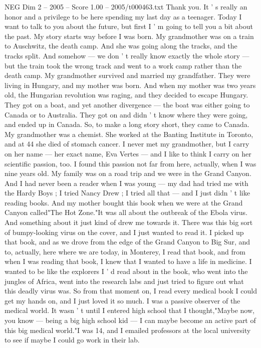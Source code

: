 \begin{textsample}{NEG Dim 2 – 2005 – Score 1.00 – 2005/t000463.txt}  \label{ex:f2_neg_074}
Thank you.
It ' s really an honor and a privilege to be here spending my last day as a teenager.
Today I want to talk to you about the future, but first I ' m going to tell you a bit about the past.
My story starts way before I was born.
My grandmother was on a train to Auschwitz, the death camp.
And she was going along the tracks, and the tracks split.
And somehow — we don ' t really know exactly the whole story — but the train took the wrong track and went to a work camp rather than the death camp.
My grandmother survived and married my grandfather.
They were living in Hungary, and my mother was born.
And when my mother was two years old, the Hungarian revolution was raging, and they decided to escape Hungary.
They got on a boat, and yet another divergence — the boat was either going to Canada or to Australia.
They got on and didn ' t know where they were going, and ended up in Canada.
So, to make a long story short, they came to Canada.
My grandmother was a chemist.
She worked at the Banting Institute in Toronto, and at 44 she died of stomach cancer.
I never met my grandmother, but I carry on her name — her exact name, Eva Vertes — and I like to think I carry on her scientific passion, too.
I found this passion not far from here, actually, when I was nine years old.
My family was on a road trip and we were in the Grand Canyon.
And I had never been a reader when I was young — my dad had tried me with the Hardy Boys ; I tried Nancy Drew ; I tried all that — and I just didn ' t like reading books.
And my mother bought this book when we were at the Grand Canyon called"The Hot Zone."It was all about the outbreak of the Ebola virus.
And something about it just kind of drew me towards it.
There was this big sort of bumpy-looking virus on the cover, and I just wanted to read it.
I picked up that book, and as we drove from the edge of the Grand Canyon to Big Sur, and to, actually, here where we are today, in Monterey, I read that book, and from when I was reading that book, I knew that I wanted to have a life in medicine.
I wanted to be like the explorers I ' d read about in the book, who went into the jungles of Africa, went into the research labs and just tried to figure out what this deadly virus was.
So from that moment on, I read every medical book I could get my hands on, and I just loved it so much.
I was a passive observer of the medical world.
It wasn ' t until I entered high school that I thought,"Maybe now, you know — being a big high school kid — I can maybe become an active part of this big medical world."I was 14, and I emailed professors at the local university to see if maybe I could go work in their lab.

\end{textsample}
